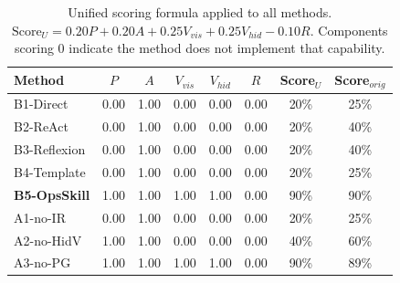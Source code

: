 \begin{table}[t]
\centering
\caption{Unified scoring formula applied to all methods. $\text{Score}_{U} = 0.20 P + 0.20 A + 0.25 V_{vis} + 0.25 V_{hid} - 0.10 R$. Components scoring 0 indicate the method does not implement that capability.}
\label{tab:unified-eval}
\small
\begin{tabular}{lccccccc}
\toprule
\textbf{Method} & $P$ & $A$ & $V_{vis}$ & $V_{hid}$ & $R$ & \textbf{Score}$_{U}$ & \textbf{Score}$_{orig}$ \\
\midrule
B1-Direct & 0.00 & 1.00 & 0.00 & 0.00 & 0.00 & 20\% & 25\% \\
B2-ReAct & 0.00 & 1.00 & 0.00 & 0.00 & 0.00 & 20\% & 40\% \\
B3-Reflexion & 0.00 & 1.00 & 0.00 & 0.00 & 0.00 & 20\% & 40\% \\
B4-Template & 0.00 & 1.00 & 0.00 & 0.00 & 0.00 & 20\% & 25\% \\
\textbf{B5-OpsSkill} & 1.00 & 1.00 & 1.00 & 1.00 & 0.00 & 90\% & 90\% \\
A1-no-IR & 0.00 & 1.00 & 0.00 & 0.00 & 0.00 & 20\% & 25\% \\
A2-no-HidV & 1.00 & 1.00 & 0.00 & 0.00 & 0.00 & 40\% & 60\% \\
A3-no-PG & 1.00 & 1.00 & 1.00 & 1.00 & 0.00 & 90\% & 89\% \\
\bottomrule
\end{tabular}
\end{table}